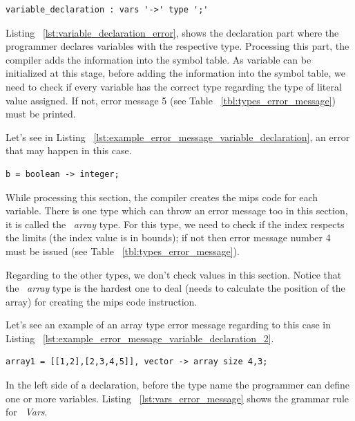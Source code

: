 \documentclass[
  oneside,
  11pt, a4paper,
  footinclude=true,
  headinclude=true,
  cleardoublepage=empty
]{scrbook}
\begin{document}
\begin{lstlisting}[label={lst:variable_declaration_error},caption={Variable declaration rule in LISS}]
  variable_declaration : vars '->' type ';'
\end{lstlisting}

Listing ~\ref{lst:variable_declaration_error}, shows the declaration part where the programmer declares variables with the respective type.
Processing this part, the compiler adds the information into the symbol table.
As variable can be initialized at this stage, before adding the information into the symbol table, we need to check if every variable has the correct type regarding the type of literal value assigned. If not, error message 5 (see Table ~\ref{tbl:types_error_message}) must be printed.

Let's see in Listing ~\ref{lst:example_error_message_variable_declaration}, an error that may happen in this case.

\begin{lstlisting}[label={lst:example_error_message_variable_declaration},caption={Example of an error message in variable declaration}]
  b = boolean -> integer;
\end{lstlisting}

While processing this section, the compiler creates the mips code for each variable. There is one type which can throw an error message too in this section, it is called the ~\textit{array} type. For this type, we need to check if the index respects the limits (the index value is in bounds); if not then error message number 4 must be issued (see Table ~\ref{tbl:types_error_message}).

Regarding to the other types, we don't check values in this section. Notice that the ~\textit{array} type is the hardest one to deal (needs to calculate the position of the array) for creating the mips code instruction.

Let's see an example of an array type error message regarding to this case in Listing ~\ref{lst:example_error_message_variable_declaration_2}.

\begin{lstlisting}[label={lst:example_error_message_variable_declaration_2},caption={Example of an error message in variable declaration for the array type}]
  array1 = [[1,2],[2,3,4,5]], vector -> array size 4,3;
\end{lstlisting}

In the left side of a declaration, before the type name the programmer can define one or more variables. Listing ~\ref{lst:vars_error_message} shows the grammar rule for ~\textit{Vars}.
\end{document}
